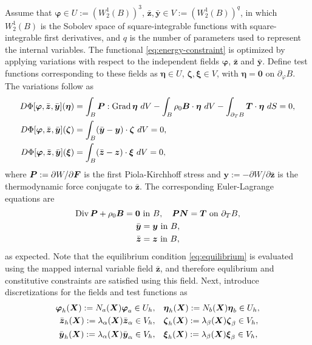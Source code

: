 \documentclass[12pt]{article}
\newcommand{\mbs}[1]{\boldsymbol{#1}}
\def\bP{{\mbs{P}}} \def\bQ{{\mbs{Q}}} \def\bR{{\mbs{R}}}
\def\by{{\mbs{y}}} \def\bz{{\mbs{z}}}
\def\bzeta{{\mbs{\zeta}}}
\def\beeta{{\mbs{\eta}}}
\def\bxi{{\mbs{\xi}}}
\def\bvarphi{{\mbs{\varphi}}}
\DeclareMathOperator{\Div}{Div}
\DeclareMathOperator{\Grad}{Grad}
\begin{document}
Assume that $\bvarphi \in U := (W^1_2(B))^3$, $\bar{\bz}, \bar{\by}
\in V := (W^1_2(B))^q$, in which $W^1_2(B)$ is the Sobolev space of
square-integrable functions with square-integrable first derivatives,
and $q$ is the number of parameters used to represent the internal
variables. The functional \eqref{eq:energy-constraint} is optimized
by applying variations with respect to the independent fields
$\bvarphi$, $\bar{\bz}$ and $\bar{\by}$. Define test functions
corresponding to these fields as $\beeta \in U$, $\bzeta, \bxi \in V$,
with $\beeta = \mathbf{0}$ on $\partial_{\varphi}B$. The variations
follow as
\begin{align}\label{eq:variations-phi}
  D\Phi[ \bvarphi, \bar{\bz}, \bar{\by} ](\beeta)
  & =
  \int_B \bP : \Grad \beeta \ dV - \int_B \rho_0 \bB \cdot \beeta \ dV
  -
  \int_{\partial_T B} \bT \cdot \beeta \ dS = 0,
  \\
  D\Phi[ \bvarphi, \bar{\bz}, \bar{\by} ](\bzeta)
  & =
  \int_B (\bar{\by} - \by) \cdot \bzeta \ dV = 0,
  \label{eq:variations-y}
  \\
  D\Phi[ \bvarphi, \bar{\bz}, \bar{\by} ](\bxi)
  & =
  \int_B (\bar{\bz} - \bz) \cdot \bxi \ dV = 0,
  \label{eq:variations-z}
\end{align}
where $\bP := \partial W / \partial \bF$ is the first Piola-Kirchhoff
stress and $\by := - \partial W / \partial \bar{\bz}$ is the
thermodynamic force conjugate to $\bar{\bz}$. The corresponding
Euler-Lagrange equations are
\begin{gather}
  \Div \bP + \rho_0 \bB = \mathbf{0} \text{ in } B, \quad
  \bP \bN = \bT \text{ on } \partial_T B, \label{eq:equilibrium}
  \\
  \bar{\by} = \by \text{ in } B,
  \\
  \bar{\bz} = \bz \text{ in } B,
\end{gather}
as expected. Note that the equilibrium condition \eqref{eq:equilibrium}
is evaluated using the mapped internal variable field $\bar{\bz}$, and
therefore equlibrium and constitutive constraints are satisfied using
this field. Next, introduce discretizations for the fields and test
functions as
\begin{align}
  \bvarphi_h(\bX) := N_a(\bX) \bvarphi_a \in U_h,
  & \quad
  \beeta_h(\bX) := N_b(\bX) \beeta_b \in U_h,
  \\
  \bar{\bz}_h(\bX) := \lambda_\alpha(\bX) \bar{\bz}_\alpha \in V_h,
  & \quad
  \bzeta_h(\bX) := \lambda_\beta(\bX) \bzeta_\beta \in V_h,
  \\
  \bar{\by}_h(\bX) := \lambda_\alpha(\bX) \bar{\by}_\alpha \in V_h,
  & \quad
  \bxi_h(\bX) := \lambda_\beta(\bX) \bxi_\beta \in V_h,
\end{align}
\end{document}
